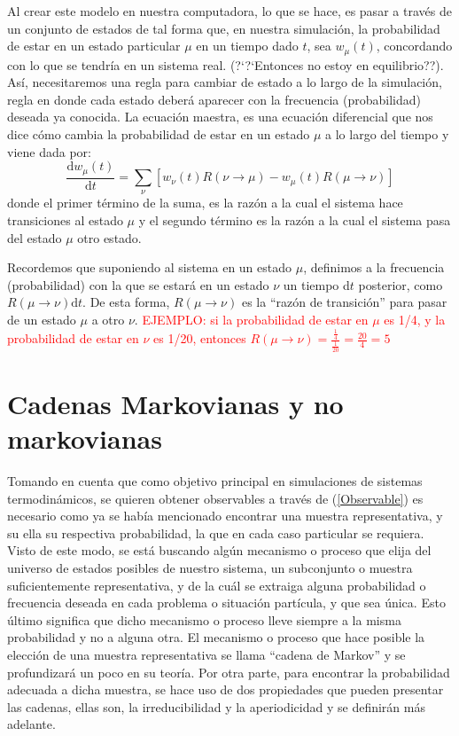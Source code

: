 \documentclass[12pt]{book}
\begin{document}
Al crear este modelo en nuestra computadora, lo que se hace, es pasar a través de un conjunto de estados de tal forma que, en nuestra simulación, la probabilidad de estar en un estado particular $\mu$ en un tiempo dado $t$, sea $w_{\mu}(t)$, concordando con lo que se tendría en un sistema real. (?`?`Entonces no estoy en equilibrio??).
Así, necesitaremos una regla para cambiar de estado a lo largo de la simulación, regla en donde cada estado deberá aparecer con la frecuencia (probabilidad) deseada ya conocida.
La ecuación maestra, es una ecuación diferencial que nos dice cómo cambia la probabilidad de estar en un estado $\mu$ a lo largo del tiempo y viene dada por:
\begin{equation}
\frac{\text{d}w_{\mu}(t)}{\text{d}t}=\sum_{\nu} [w_{\nu}(t)R(\nu \rightarrow \mu)-w_{\mu}(t)R(\mu \rightarrow \nu)]
\end{equation}
donde el primer término de la suma, es la razón a la cual el sistema hace transiciones al estado $\mu$ y el segundo término es la razón a la cual el sistema pasa del estado $\mu$ otro estado.

Recordemos que suponiendo al sistema en un estado $\mu$, definimos a la frecuencia (probabilidad) con la que se estará en un estado $\nu$ un tiempo d$t$ posterior, como $R(\mu \rightarrow \nu)\text{d}t$. De esta forma, $R(\mu \rightarrow \nu)$ es la ``razón de transición'' para pasar de un estado $\mu$ a otro $\nu$. \textcolor{red}{EJEMPLO: si la probabilidad de estar en $\mu$ es 1/4, y la probabilidad de estar en $\nu$ es 1/20, entonces $R(\mu \rightarrow \nu)=\frac{\frac{1}{4}}{\frac{1}{20}}=\frac{20}{4}=5$}

\section{Cadenas Markovianas y no markovianas}

Tomando en cuenta que como objetivo principal en simulaciones de sistemas termodinámicos, se quieren obtener observables a través de (\ref{Observable}) es necesario como ya se había mencionado encontrar una muestra representativa, y su ella su respectiva probabilidad, la que en cada caso particular se requiera. Visto de este modo, se está buscando algún mecanismo o proceso que elija del universo de estados posibles de nuestro sistema, un subconjunto o muestra suficientemente representativa, y de la cuál se extraiga alguna probabilidad o frecuencia deseada en cada problema o situación partícula, y que sea única. Esto último significa que dicho mecanismo o proceso lleve siempre a la misma probabilidad y no a alguna otra. El mecanismo o proceso que hace posible la elección de una muestra representativa se llama ``cadena de Markov'' y se profundizará un poco en su teoría. Por otra parte, para encontrar la probabilidad adecuada a dicha muestra, se hace uso de dos propiedades que pueden presentar las cadenas, ellas son, la irreducibilidad y la aperiodicidad y se definirán más adelante.
\end{document}
